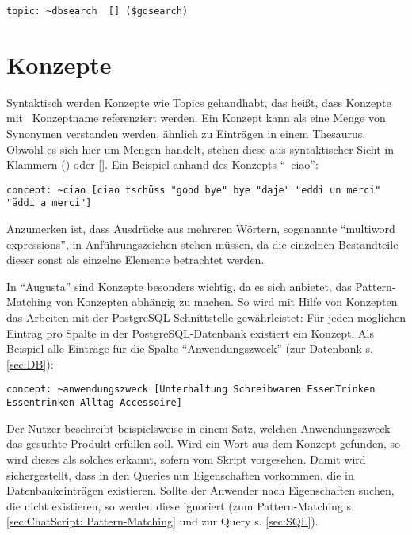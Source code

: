 \begin{lstlisting}[caption={Topicbezeichner in dbsearch.top}]
topic: ~dbsearch  [] ($gosearch)
\end{lstlisting}


\section{Konzepte}
\label{sec:ChatScript: Konzepte}

Syntaktisch werden Konzepte wie Topics gehandhabt, das heißt, dass Konzepte mit ~Konzeptname referenziert werden. Ein Konzept kann als eine Menge von Synonymen verstanden werden, ähnlich zu Einträgen in einem Thesaurus. Obwohl es sich hier um Mengen handelt, stehen diese aus syntaktischer Sicht in Klammern () oder []. Ein Beispiel anhand des Konzepts "`~ciao"':

\begin{lstlisting}[caption={Konzept 'ciao' aus konzepte.top}]
concept: ~ciao [ciao tschüss "good bye" bye "daje" "eddi un merci" "äddi a merci"]
\end{lstlisting}

Anzumerken ist, dass Ausdrücke aus mehreren Wörtern, sogenannte "`multiword expressions"', in Anführungszeichen stehen müssen, da die einzelnen Bestandteile dieser sonst als einzelne Elemente betrachtet werden.


In "`Augusta"' sind Konzepte besonders wichtig, da es sich anbietet, das Pattern-Matching von Konzepten abhängig zu machen. So wird mit Hilfe von Konzepten das Arbeiten mit der PostgreSQL-Schnittstelle gewährleistet: Für jeden möglichen Eintrag pro Spalte in der PostgreSQL-Datenbank existiert ein Konzept. Als Beispiel alle Einträge für die Spalte "`Anwendungszweck"' (zur Datenbank s. \ref{sec:DB}):  

\begin{lstlisting}[caption={Konzept 'anwendungszweck' aus konzepte.top}]
concept: ~anwendungszweck [Unterhaltung Schreibwaren EssenTrinken Essentrinken Alltag Accessoire]
\end{lstlisting}

Der Nutzer beschreibt beispielsweise in einem Satz, welchen Anwendungszweck das gesuchte Produkt erfüllen soll. Wird ein Wort aus dem Konzept gefunden, so wird dieses als solches erkannt, \textcolor[rgb]{1,0.41,0.13}{sofern vom Skript vorgesehen.} Damit wird sichergestellt, dass in den Queries nur Eigenschaften vorkommen, die in Datenbankeinträgen existieren. Sollte der Anwender nach Eigenschaften suchen, die nicht existieren, so werden diese ignoriert (zum Pattern-Matching s. \ref{sec:ChatScript: Pattern-Matching} und zur Query s. \ref{sec:SQL}). 

